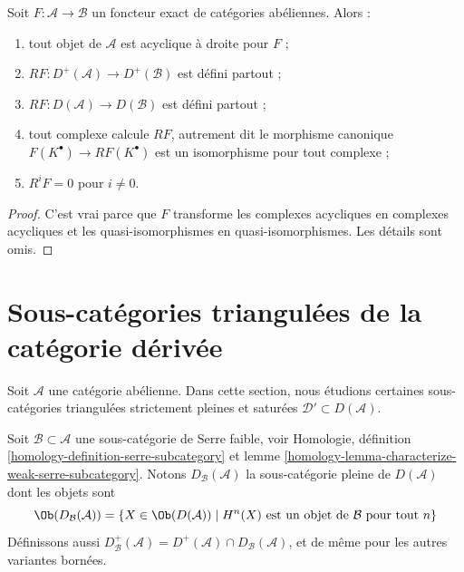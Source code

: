 \begin{lemma}
\label{lemma-right-derived-exact-functor}
Soit $F : \mathcal{A} \to \mathcal{B}$ un foncteur exact de catégories
abéliennes. Alors :
\begin{enumerate}
\item tout objet de $\mathcal{A}$ est acyclique à droite pour $F$ ;
\item $RF : D^{+}(\mathcal{A}) \to D^{+}(\mathcal{B})$ est défini partout ;
\item $RF : D(\mathcal{A}) \to D(\mathcal{B})$ est défini partout ;
\item tout complexe calcule $RF$, autrement dit le morphisme canonique
$F(K^\bullet) \to RF(K^\bullet)$ est un isomorphisme pour tout complexe ;
\item $R^iF = 0$ pour $i \not = 0$.
\end{enumerate}
\end{lemma}

\begin{proof}
C'est vrai parce que $F$ transforme les complexes acycliques en complexes
acycliques et les quasi-isomorphismes en quasi-isomorphismes. Les détails sont
omis.
\end{proof}









\section{Sous-catégories triangulées de la catégorie dérivée}
\label{section-triangulated-sub}

\noindent
Soit $\mathcal{A}$ une catégorie abélienne. Dans cette section, nous étudions
certaines sous-catégories triangulées strictement pleines et saturées
$\mathcal{D}' \subset D(\mathcal{A})$.

\medskip\noindent
Soit $\mathcal{B} \subset \mathcal{A}$ une sous-catégorie de Serre faible,
voir Homologie, définition \ref{homology-definition-serre-subcategory} et
lemme \ref{homology-lemma-characterize-weak-serre-subcategory}. Notons
$D_\mathcal{B}(\mathcal{A})$ la sous-catégorie pleine de $D(\mathcal{A})$ dont
les objets sont
$$
\Ob(D_\mathcal{B}(\mathcal{A}))
=
\{X \in \Ob(D(\mathcal{A})) \mid
H^n(X) \text{ est un objet de }\mathcal{B}\text{ pour tout }n\}
$$
Définissons aussi
$D^{+}_\mathcal{B}(\mathcal{A}) =
D^{+}(\mathcal{A}) \cap D_\mathcal{B}(\mathcal{A})$, et de même pour les
autres variantes bornées.

